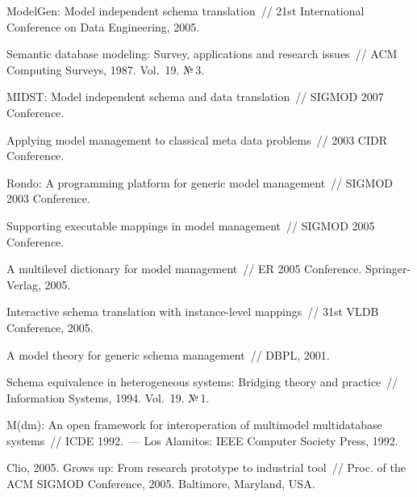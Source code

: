 \begin{multicols}{2}
{{\begin{thebibliography}{99}
ModelGen: Model independent schema translation~//
21st International Conference on Data Engineering,
2005.

Semantic database modeling: Survey, applications and research issues~//
ACM Computing Surveys, 1987. Vol.~19. №\,3.

MIDST: Model independent schema and data translation~//
SIGMOD 2007 Conference.

Applying model management to classical meta data problems~//
2003 CIDR Conference.

Rondo: A programming platform for generic model management~//
SIGMOD 2003 Conference.


Supporting executable mappings in model management~//
SIGMOD 2005 Conference.

A multilevel dictionary for model management~//
ER 2005 Conference. Springer-Verlag, 2005.

Interactive schema translation with instance-level mappings~//
31st VLDB Conference, 2005.

A model theory for generic schema management~//
DBPL, 2001.

 Schema equivalence in heterogeneous systems: Bridging theory and practice~//
 Information Systems, 1994. Vol.~19. №\,1.

M(dm): An open framework for interoperation of multimodel
multidatabase systems~//
ICDE 1992.~--- Los Alamitos: IEEE Computer Society Press, 1992.

Clio, 2005. Grows up: From research prototype to
industrial tool~// Proc. of the ACM SIGMOD Conference,
2005. Baltimore, Maryland, USA.

\end{thebibliography}

}
}

\end{multicols}

\label{end\stat}